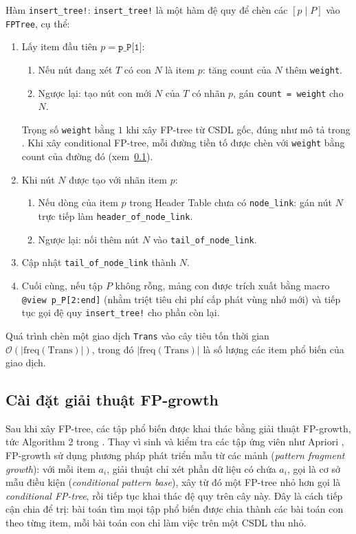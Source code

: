 \documentclass[conference]{IEEEtran}
\begin{document}
Hàm \texttt{insert\_tree!}:
\texttt{insert\_tree!} là một hàm đệ quy để chèn các $[p \mid P]$ vào \texttt{FPTree}, cụ thể:
\begin{enumerate}
    \item Lấy item đầu tiên $p = \texttt{p\_P[1]}$:
    \begin{enumerate}
        \item Nếu nút đang xét $T$ có con $N$ là item $p$: tăng count của $N$ thêm \texttt{weight}.
        \item Ngược lại: tạo nút con mới $N$ của $T$ có nhãn $p$, gán \texttt{count = weight} cho $N$.
    \end{enumerate}
    Trọng số \texttt{weight} bằng $1$ khi xây FP-tree từ CSDL gốc, đúng như mô tả trong \cite{han2000mining}. Khi xây conditional FP-tree, mỗi đường tiền tố được chèn với \texttt{weight} bằng count của đường đó (xem~\ref{subsec:fp-growth}).
    \item Khi nút $N$ được tạo với nhãn item $p$:
    \begin{enumerate}
        \item Nếu dòng của item $p$ trong Header Table chưa có \texttt{node\_link}: gán nút $N$ trực tiếp làm \texttt{header\_of\_node\_link}.
        \item Ngược lại: nối thêm nút $N$ vào \texttt{tail\_of\_node\_link}.
    \end{enumerate}
    \item Cập nhật \texttt{tail\_of\_node\_link} thành $N$.
    \item Cuối cùng, nếu tập $P$ không rỗng, mảng con được trích xuất bằng macro \texttt{@view p\_P[2:end]} (nhằm triệt tiêu chi phí cấp phát vùng nhớ mới) và tiếp tục gọi đệ quy \texttt{insert\_tree!} cho phần còn lại.
\end{enumerate}

Quá trình chèn một giao dịch \texttt{Trans} vào cây tiêu tốn thời gian $\mathcal{O}(|\text{freq}(\text{Trans})|)$, trong đó $|\text{freq}(\text{Trans})|$ là số lượng các item phổ biến của giao dịch.

\subsection{Cài đặt giải thuật FP-growth}
\label{subsec:fp-growth}
Sau khi xây FP-tree, các tập phổ biến được khai thác bằng giải thuật FP-growth, tức Algorithm 2 trong \cite{han2000mining}. Thay vì sinh và kiểm tra các tập ứng viên như Apriori \cite{agrawal1994fast}, FP-growth sử dụng phương pháp phát triển mẫu từ các mảnh (\textit{pattern fragment growth}): với mỗi item $a_i$, giải thuật chỉ xét phần dữ liệu có chứa $a_i$, gọi là cơ sở mẫu điều kiện (\textit{conditional pattern base}), xây từ đó một FP-tree nhỏ hơn gọi là \textit{conditional FP-tree}, rồi tiếp tục khai thác đệ quy trên cây này. Đây là cách tiếp cận chia để trị: bài toán tìm mọi tập phổ biến được chia thành các bài toán con theo từng item, mỗi bài toán con chỉ làm việc trên một CSDL thu nhỏ.
\end{document}
